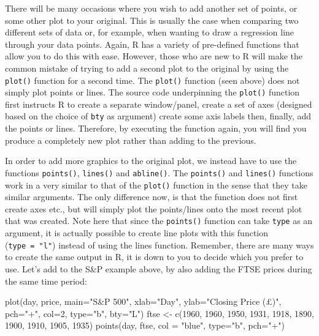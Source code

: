\documentclass[
]{book}
\newenvironment{Shaded}{\begin{snugshade}}{\end{snugshade}}
\newcommand{\AttributeTok}[1]{\textcolor[rgb]{0.77,0.63,0.00}{#1}}
\newcommand{\DecValTok}[1]{\textcolor[rgb]{0.00,0.00,0.81}{#1}}
\newcommand{\FunctionTok}[1]{\textcolor[rgb]{0.00,0.00,0.00}{#1}}
\newcommand{\NormalTok}[1]{#1}
\newcommand{\OtherTok}[1]{\textcolor[rgb]{0.56,0.35,0.01}{#1}}
\newcommand{\StringTok}[1]{\textcolor[rgb]{0.31,0.60,0.02}{#1}}
\theoremstyle{definition}
\theoremstyle{definition}
\theoremstyle{definition}
\theoremstyle{definition}
\theoremstyle{remark}
\begin{document}
There will be many occasions where you wish to add another set of points, or some other plot to your original. This is usually the case when comparing two different sets of data or, for example, when wanting to draw a regression line through your data points. Again, R has a variety of pre-defined functions that allow you to do this with ease. However, those who are new to R will make the common mistake of trying to add a second plot to the original by using the \texttt{plot()} function for a second time. The \texttt{plot()} function (seen above) does not simply plot points or lines. The source code underpinning the \texttt{plot()} function first instructs R to create a separate window/panel, create a set of axes (designed based on the choice of \texttt{bty} as argument) create some axis labels then, finally, add the points or lines. Therefore, by executing the function again, you will find you produce a completely new plot rather than adding to the previous.

In order to add more graphics to the original plot, we instead have to use the functions \texttt{points()}, \texttt{lines()} and \texttt{abline()}. The \texttt{points()} and \texttt{lines()} functions work in a very similar to that of the \texttt{plot()} function in the sense that they take similar arguments. The only difference now, is that the function does not first create axes etc., but will simply plot the points/lines onto the most recent plot that was created. Note here that since the \texttt{points()} function can take \texttt{type} as an argument, it is actually possible to create line plots with this function (\texttt{type\ =\ "l"}) instead of using the lines function. Remember, there are many ways to create the same output in R, it is down to you to decide which you prefer to use. Let's add to the S\&P example above, by also adding the FTSE prices during the same time period:

\begin{Shaded}
\begin{Highlighting}[]
\FunctionTok{plot}\NormalTok{(day, price,}
     \AttributeTok{main=}\StringTok{"S\&P 500"}\NormalTok{,}
     \AttributeTok{xlab=}\StringTok{"Day"}\NormalTok{,}
     \AttributeTok{ylab=}\StringTok{"Closing Price (£)"}\NormalTok{,}
     \AttributeTok{pch=}\StringTok{"+"}\NormalTok{,}
     \AttributeTok{col=}\DecValTok{2}\NormalTok{,}
     \AttributeTok{type=}\StringTok{"b"}\NormalTok{,}
     \AttributeTok{bty=}\StringTok{"L"}\NormalTok{)}
\NormalTok{ftse }\OtherTok{\textless{}{-}} \FunctionTok{c}\NormalTok{(}\DecValTok{1960}\NormalTok{, }\DecValTok{1960}\NormalTok{, }\DecValTok{1950}\NormalTok{, }\DecValTok{1931}\NormalTok{, }\DecValTok{1918}\NormalTok{, }\DecValTok{1890}\NormalTok{, }\DecValTok{1900}\NormalTok{, }\DecValTok{1910}\NormalTok{, }\DecValTok{1905}\NormalTok{, }\DecValTok{1935}\NormalTok{)}
\FunctionTok{points}\NormalTok{(day, ftse,}
       \AttributeTok{col =} \StringTok{"blue"}\NormalTok{,}
       \AttributeTok{type=}\StringTok{"b"}\NormalTok{,}
       \AttributeTok{pch=}\StringTok{"+"}\NormalTok{)}
\end{Highlighting}
\end{Shaded}
\end{document}
